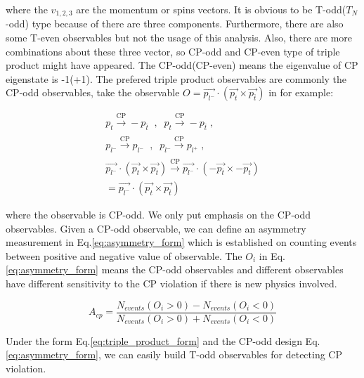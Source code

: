 		where the $v_{1,2,3}$ are the momentum or spins vectors. It is obvious to be T-odd($T_{N}$-odd) type because of there are three components. Furthermore, there are also some T-even observables but not the usage of this analysis. Also, there are more combinations about these three vector, so CP-odd and CP-even type of triple product might have appeared. The CP-odd(CP-even) means the eigenvalue of CP eigenstate is -1(+1). The prefered triple product observables are commonly the CP-odd observables, take the observable $O = \vec{p_{l^-}} \cdot ( \vec{p_{t}} \times \vec{p_{\bar{t}}} )$ in \cite{PhysRevLett.58.451} for example:

		\begin{equation}
		\begin{split}
		p_{t}\xrightarrow[\text{}]{\text{CP}} -p_{\bar{t}} \; \; , \; \; p_{t}\xrightarrow[\text{}]{\text{CP}} -p_{\bar{t}} \; , \; \; \\
		p_{l^-} \xrightarrow[\text{}]{\text{CP}} p_{l^-} \; \; , \; \; p_{l^-} \xrightarrow[\text{}]{\text{CP}} p_{l^+} \;, \\
		\vec{p_{l^-}} \cdot ( \vec{p_{t}} \times \vec{p_{\overline{t}}} ) \xrightarrow[]{\text{CP}} \vec{p_{l^-}} \cdot ( - \vec{p_{\overline{t}}} \times - \vec{p_{t}} ) \\
		= \vec{p_{l^-}} \cdot ( \vec{p_{t}} \times \vec{p_{\overline{t}}} ) \;\;\;\;\;\;
		\end{split}
		\label{eq:ex_obs_eett}
		\end{equation}
		\FloatBarrier

		where the observable is CP-odd. We only put emphasis on the CP-odd observables. Given a CP-odd observable, we can define an asymmetry measurement in Eq.\ref{eq:asymmetry_form} which is established on counting events between positive and negative value of observable. The $O_i$ in Eq.\ref{eq:asymmetry_form} means the CP-odd observables and different observables have different sensitivity to the CP violation if there is new physics involved.

		\begin{equation}
		A_{cp} = \frac{ N_{events}(O_i>0) - N_{events}(O_i<0) }{ N_{events}(O_i>0) + N_{events}(O_i<0) }
		\label{eq:asymmetry_form}
		\end{equation}
		\FloatBarrier

		Under the form Eq.\ref{eq:triple_product_form} and the CP-odd design Eq.\ref{eq:asymmetry_form}, we can easily build T-odd observables for detecting CP violation. \\
		
